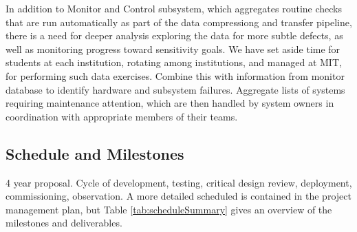 \documentclass[preprint]{aastex}
\begin{document}
In addition to Monitor and Control subsystem, which aggregates routine checks that are run automatically as
part of the data compressiong and transfer pipeline, there is a need for deeper analysis
exploring the data for more subtle defects, as well as monitoring progress toward sensitivity goals.
We have set aside time for students at each institution, rotating among institutions, and managed at MIT,
for performing such data exercises.
Combine this with information from monitor database to identify hardware and subsystem failures.
Aggregate lists of systems requiring maintenance attention, which are then handled by system owners
in coordination with appropriate members of their teams.

%

\subsection{Schedule and Milestones} %

4 year proposal.
Cycle of development, testing, critical design review, deployment, commissioning, observation.
A more detailed scheduled is contained in the project management plan, but Table \ref{tab:scheduleSummary} gives an overview
of the milestones and deliverables.
\end{document}
